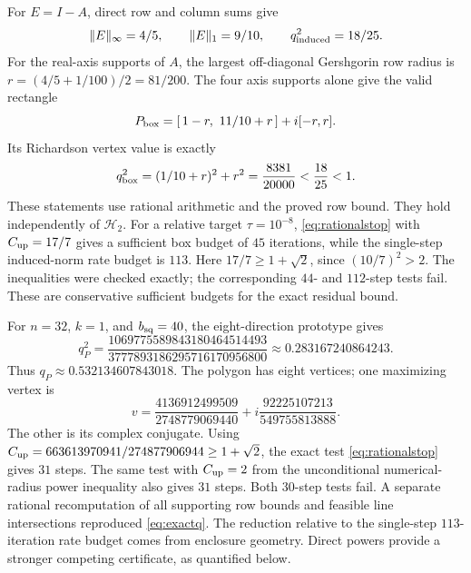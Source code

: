 \documentclass[11pt]{article}
\newcommand{\norm}[1]{\lVert #1\rVert}
\newcommand{\HH}{\mathcal H}
\theoremstyle{definition}
\theoremstyle{remark}
\numberwithin{equation}{section}
\begin{document}
For \(E=I-A\), direct row and column sums give
\[
 \norm{E}_\infty=4/5,\qquad
 \norm{E}_1=9/10,\qquad
 q_{\rm induced}^2=18/25.
\]
For the real-axis supports of \(A\), the largest off-diagonal Gershgorin
row radius is \(r=(4/5+1/100)/2=81/200\).
The four axis supports alone give the valid rectangle
\[
 P_{\rm box}=
 [\,1-r,\ 11/10+r\,]+i[-r,r].
\]
Its Richardson vertex value is exactly
\begin{equation}\label{eq:coupled}
 q_{\rm box}^2=(1/10+r)^2+r^2
 =\frac{8381}{20000}<\frac{18}{25}<1.
\end{equation}
These statements use rational arithmetic and the proved row bound.
They hold independently of \(\HH_2\).
For a relative target \(\tau=10^{-8}\),
\eqref{eq:rationalstop} with \(C_{\rm up}=17/7\) gives a sufficient box
budget of \(45\) iterations, while the single-step induced-norm rate
budget is \(113\).
Here \(17/7\ge1+\sqrt2\), since \((10/7)^2>2\).
The inequalities were checked exactly; the corresponding \(44\)- and
\(112\)-step tests fail.
These are conservative sufficient budgets for the exact residual bound.

For \(n=32\), \(k=1\), and \(b_{\rm sq}=40\), the eight-direction
prototype gives
\begin{equation}\label{eq:exactq}
 q_P^2=
 \frac{1069775589843180464514493}
      {3777893186295716170956800}
 \approx0.283167240864243.
\end{equation}
Thus \(q_P\approx0.532134607843018\).
The polygon has eight vertices; one maximizing vertex is
\[
 v=\frac{4136912499509}{2748779069440}
    +i\frac{92225107213}{549755813888}.
\]
The other is its complex conjugate.
Using
\(C_{\rm up}=663613970941/274877906944\ge1+\sqrt2\),
the exact test \eqref{eq:rationalstop} gives \(31\) steps.
The same test with \(C_{\rm up}=2\) from the unconditional
numerical-radius power inequality also gives \(31\) steps.
Both \(30\)-step tests fail.
A separate rational recomputation of all supporting row bounds and feasible
line intersections reproduced \eqref{eq:exactq}.
The reduction relative to the single-step \(113\)-iteration rate budget
comes from enclosure geometry. Direct powers provide a stronger competing
certificate, as quantified below.
\end{document}
